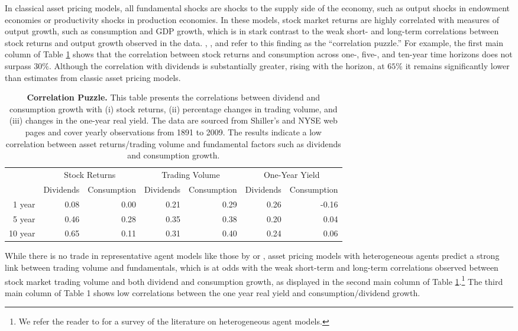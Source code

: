\documentclass[preprint,11pt,authoryear]{elsarticle}
\theoremstyle{plain}
\begin{document}
In classical asset pricing models, all fundamental shocks
 are shocks to the supply side of the economy, such as output shocks in \cite{Lucas1978} endowment economies or productivity shocks in \cite{Jermann1998} production economies. In these models, stock market returns are highly correlated with measures of output growth, such as consumption and GDP growth, which is in stark contrast to the weak short- and long-term correlations between stock returns and output growth observed in the data. \cite{CochraneHansen1992}, \cite{campbell-cochrane:99}, and \cite{Cochrane2005} refer to this finding as the ``correlation puzzle.'' For example, the first main column of Table \ref{table:CorrelationPuzzle} shows that the correlation between stock returns and consumption across one-, five-, and ten-year time horizons does not surpass $30\%$. Although the correlation with dividends is substantially greater, rising with the horizon, at $65\%$ it remains significantly lower than estimates from classic asset pricing models. 
 
 \begin{table}[htbp]
 \centering
  \begin{tabular}{r|rr|rr|rr}
   \toprule
   & \multicolumn{2}{c}{Stock Returns} & \multicolumn{2}{c}{Trading Volume} & \multicolumn{2}{c}{One-Year Yield} \\
   & Dividends & Consumption &Dividends & Consumption  &Dividends & Consumption \\
   \hline
    1 year & 0.08 & 0.00 & 0.21 & 0.29 & 0.26 & -0.16 \\
    5 year & 0.46 & 0.28 & 0.35 & 0.38 & 0.20 & 0.04 \\
    10 year & 0.65 & 0.11 & 0.31 & 0.40 & 0.24 & 0.06 \\
    \bottomrule
 \end{tabular}
  \caption{{\bf Correlation Puzzle.} This table presents the correlations between dividend and consumption growth with (i) stock returns, (ii) percentage changes in trading volume, and (iii) changes in the one-year real yield. The data are sourced from Shiller's and NYSE web pages and cover yearly observations from 1891 to 2009. The results indicate a low correlation between asset returns/trading volume and fundamental factors such as dividends and consumption growth.}
 \label{table:CorrelationPuzzle}
 \end{table}
 While there is no trade in representative agent models like those by \cite{campbell-cochrane:99} or \cite{bansal-yaron:04}, asset pricing models with heterogeneous agents predict a strong link between trading volume and fundamentals, which is at odds with the weak short-term and long-term correlations observed between stock market trading volume and both dividend and consumption growth, as displayed in the second main column of Table \ref{table:CorrelationPuzzle}.\footnote{We refer the reader to \cite{panageas:2020} for a survey of the literature on heterogeneous agent models.} The third main column of Table 1 shows low correlations between the one year real yield and consumption/dividend growth. %
\end{document}
